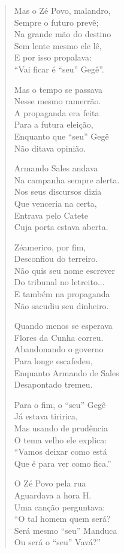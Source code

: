 \begin{verse}
Mas o Zé Povo, malandro,\\
Sempre o futuro prevê;\\
Na grande mão do destino\\
Sem lente mesmo ele lê,\\
E por isso propalava:\\
“Vai ficar é “seu” Gegê”.

Mas o tempo se passava\\
Nesse mesmo ramerrão.\\
A propaganda era feita\\
Para a futura eleição,\\
Enquanto que “seu” Gegê\\
Não ditava opinião.

Armando Sales andava\\
Na campanha sempre alerta.\\
Nos seus discursos dizia\\
Que venceria na certa,\\
Entrava pelo Catete\\
Cuja porta estava aberta.

Zéamerico, por fim,\\
Desconfiou do terreiro.\\
Não quis seu nome escrever\\
Do tribunal no letreito...\\
E também na propaganda\\
Não sacudiu seu dinheiro.


Quando menos se esperava\\
Flores da Cunha correu.\\
Abandonando o governo\\
Para longe escafedeu,\\
Enquanto Armando de Sales\\
Desapontado tremeu.

Para o fim, o “seu” Gegê\\
Já estava tiririca,\\
Mas usando de prudência\\
O tema velho ele explica:\\
“Vamos deixar como está\\
Que é para ver como fica.”

O Zé Povo pela rua\\
Aguardava a hora H.\\
Uma canção perguntava:\\
“O tal homem quem será?\\
Será mesmo “seu” Manduca\\
Ou será o “seu” Vavá?”


\end{verse}
